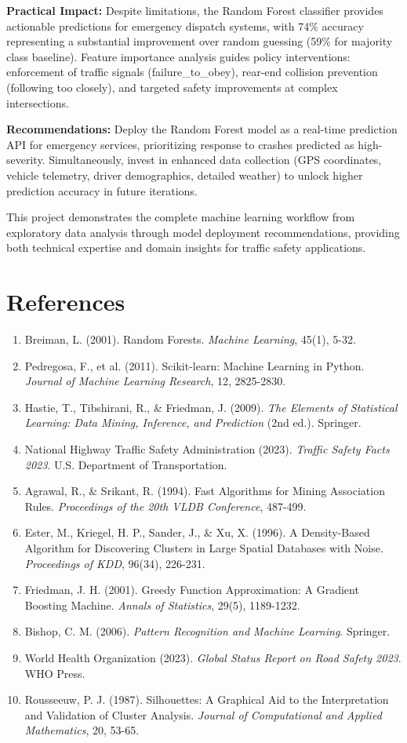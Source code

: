 \documentclass[12pt,man]{apa7}
\begin{document}
\textbf{Practical Impact:} Despite limitations, the Random Forest classifier provides actionable predictions for emergency dispatch systems, with 74\% accuracy representing a substantial improvement over random guessing (59\% for majority class baseline). Feature importance analysis guides policy interventions: enforcement of traffic signals (failure\_to\_obey), rear-end collision prevention (following too closely), and targeted safety improvements at complex intersections.

\textbf{Recommendations:} Deploy the Random Forest model as a real-time prediction API for emergency services, prioritizing response to crashes predicted as high-severity. Simultaneously, invest in enhanced data collection (GPS coordinates, vehicle telemetry, driver demographics, detailed weather) to unlock higher prediction accuracy in future iterations.

This project demonstrates the complete machine learning workflow from exploratory data analysis through model deployment recommendations, providing both technical expertise and domain insights for traffic safety applications.

\section{References}

\begin{enumerate}
    \item Breiman, L. (2001). Random Forests. \textit{Machine Learning}, 45(1), 5-32.
    \item Pedregosa, F., et al. (2011). Scikit-learn: Machine Learning in Python. \textit{Journal of Machine Learning Research}, 12, 2825-2830.
    \item Hastie, T., Tibshirani, R., \& Friedman, J. (2009). \textit{The Elements of Statistical Learning: Data Mining, Inference, and Prediction} (2nd ed.). Springer.
    \item National Highway Traffic Safety Administration (2023). \textit{Traffic Safety Facts 2023}. U.S. Department of Transportation.
    \item Agrawal, R., \& Srikant, R. (1994). Fast Algorithms for Mining Association Rules. \textit{Proceedings of the 20th VLDB Conference}, 487-499.
    \item Ester, M., Kriegel, H. P., Sander, J., \& Xu, X. (1996). A Density-Based Algorithm for Discovering Clusters in Large Spatial Databases with Noise. \textit{Proceedings of KDD}, 96(34), 226-231.
    \item Friedman, J. H. (2001). Greedy Function Approximation: A Gradient Boosting Machine. \textit{Annals of Statistics}, 29(5), 1189-1232.
    \item Bishop, C. M. (2006). \textit{Pattern Recognition and Machine Learning}. Springer.
    \item World Health Organization (2023). \textit{Global Status Report on Road Safety 2023}. WHO Press.
    \item Rousseeuw, P. J. (1987). Silhouettes: A Graphical Aid to the Interpretation and Validation of Cluster Analysis. \textit{Journal of Computational and Applied Mathematics}, 20, 53-65.
\end{enumerate}
\end{document}
